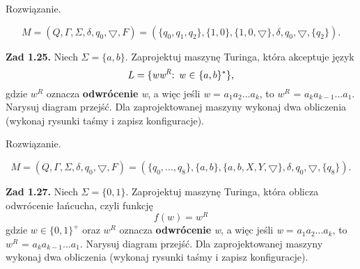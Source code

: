 \documentclass[12pt]{article}
\begin{document}
 Rozwiązanie.
 
\[M=(Q,\Gamma,\Sigma,\delta,q_0,\bigtriangledown,F)=(\{q_0,q_1,q_2\},\{1,0\},\{1,0,\bigtriangledown\},\delta,q_0,\bigtriangledown,\{q_2\}).\]

\vspace{20pt}

\begin{center}
\end{center}

\newpage

\noindent\textbf{Zad 1.25.} Niech $\Sigma=\{a,b\}$. Zaprojektuj maszynę Turinga, która akceptuje język
\[L=\{\text{\textit{w}${\textit{w}^\textit{R}}$: \textit{w} $\in$ $\{a,b\}^*$\},}\]
gdzie ${\textit{w}^\textit{R}}$ oznacza \textbf{odwrócenie} \textit{w},  a  więc  jeśli \textit{w} = $a_1a_2...a_k$, to ${\textit{w}^\textit{R}}$ = $a_ka_{k-1}...a_1$. Narysuj  diagram  przejść. Dla  zaprojektowanej  maszyny  wykonaj dwa obliczenia (wykonaj rysunki taśmy i zapisz konfiguracje).

 Rozwiązanie.
 
\[M=(Q,\Gamma,\Sigma,\delta,q_0,\bigtriangledown,F)=(\{q_0,...,q_8\},\{a,b\},\{a,b,X,Y,\bigtriangledown\},\delta,q_0,\bigtriangledown,\{q_8\}).\]

\newpage

\noindent\textbf{Zad 1.27.} Niech $\Sigma=\{0,1\}$.  Zaprojektuj  maszynę  Turinga,  która  oblicza odwrócenie łańcucha, czyli funkcję
\[f(w)=w^R\]
gdzie $\textit{w}\in\{0,1\}^+$ oraz ${\textit{w}^\textit{R}}$ oznacza \textbf{odwrócenie} \textit{w},  a  więc  jeśli \textit{w} = $a_1a_2...a_k$, to ${\textit{w}^\textit{R}}$ = $a_ka_{k-1}...a_1$. Narysuj  diagram  przejść. Dla  zaprojektowanej  maszyny  wykonaj dwa obliczenia (wykonaj rysunki taśmy i zapisz konfiguracje).
\end{document}
